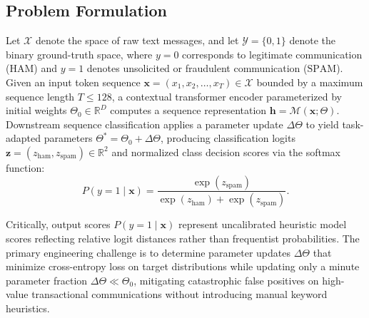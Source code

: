 \documentclass[conference]{IEEEtran}
\begin{document}
\subsection{Problem Formulation}
Let $\mathcal{X}$ denote the space of raw text messages, and let $\mathcal{Y} = \{0, 1\}$ denote the binary ground-truth space, where $y=0$ corresponds to legitimate communication ($\text{HAM}$) and $y=1$ denotes unsolicited or fraudulent communication ($\text{SPAM}$). Given an input token sequence $\mathbf{x} = (x_1, x_2, \dots, x_T) \in \mathcal{X}$ bounded by a maximum sequence length $T \le 128$, a contextual transformer encoder parameterized by initial weights $\Theta_0 \in \mathbb{R}^D$ computes a sequence representation $\mathbf{h} = \mathcal{M}(\mathbf{x}; \Theta)$. Downstream sequence classification applies a parameter update $\Delta \Theta$ to yield task-adapted parameters $\Theta^* = \Theta_0 + \Delta \Theta$, producing classification logits $\mathbf{z} = (z_{\text{ham}}, z_{\text{spam}}) \in \mathbb{R}^2$ and normalized class decision scores via the softmax function:
\begin{equation}
    P(y = 1 \mid \mathbf{x}) = \frac{\exp(z_{\text{spam}})}{\exp(z_{\text{ham}}) + \exp(z_{\text{spam}})}.
    \label{eq:softmax}
\end{equation}

Critically, output scores $P(y = 1 \mid \mathbf{x})$ represent uncalibrated heuristic model scores reflecting relative logit distances rather than frequentist probabilities. The primary engineering challenge is to determine parameter updates $\Delta \Theta$ that minimize cross-entropy loss on target distributions while updating only a minute parameter fraction $\Delta \Theta \ll \Theta_0$, mitigating catastrophic false positives on high-value transactional communications without introducing manual keyword heuristics.
\end{document}
